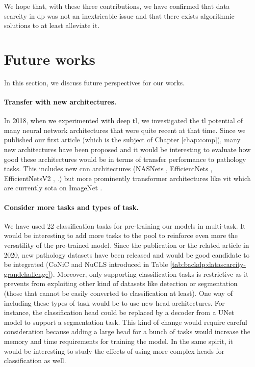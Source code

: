 We hope that, with these three contributions, we have confirmed that data scarcity in \acrlong{dp} was not an inextricable issue and that there exists algorithmic solutions to at least alleviate it. 

\section{Future works}
\label{sec:concl:futureworks}

In this section, we discuss future perspectives for our works.

\paragraph{Transfer with new architectures.} In 2018, when we experimented with deep \acrlong{tl}, we investigated the \acrlong{tl} potential of many neural network architectures that were quite recent at that time. Since we published our first article (which is the subject of Chapter \ref{chap:comp}), many new architectures have been proposed and it would be interesting to evaluate how good these architectures would be in terms of transfer performance to pathology tasks. This includes new \acrlong{cnn} architectures (\eg NASNets \cite{zoph2018learning}, EfficientNets \cite{tan2019efficientnet}, EfficientNetsV2 \cite{tan2021efficientnetv2}, \etc.) but more prominently transformer architectures like \acrshort{vit} which are currently \acrlong{sota} on ImageNet \cite{yu2022coca}.

\paragraph{Consider more tasks and types of task.} We have used 22 classification tasks for pre-training our models in multi-task. It would be interesting to add more tasks to the pool to reinforce even more the versatility of the pre-trained model. Since the publication or the related article in 2020, new pathology datasets have been released and would be good candidate to be integrated (\eg CoNiC and NuCLS introduced in Table \ref{tab:backdp:datascarcity-grandchallenge}).  Moreover, only supporting classification tasks is restrictive as it prevents from exploiting other kind of datasets like detection or segmentation (those that cannot be easily converted to classification at least). One way of including these types of task would be to use new head architectures. For instance, the classification head could be replaced by a decoder from a UNet model to support a segmentation task. This kind of change would require careful consideration because adding a large head for a bunch of tasks would increase the memory and time requirements for training the model. In the same spirit, it would be interesting to study the effects of using more complex heads for classification as well.  

